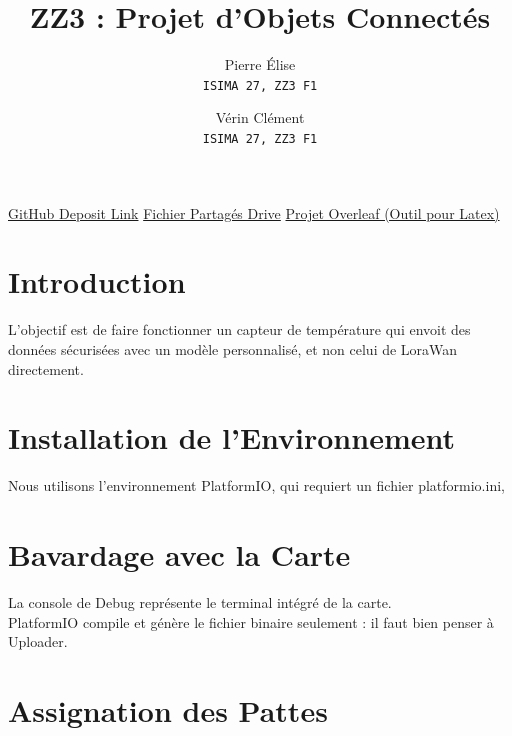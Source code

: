 \documentclass[10pt,a4paper,oneside]{article}
\author
{
  Pierre Élise \\ \texttt{ISIMA 27, ZZ3 F1}
  \and
  Vérin Clément \\ \texttt{ISIMA 27, ZZ3 F1}
}
\title{ZZ3 : Projet d'Objets Connectés}
\begin{document}
\fbox
{
  \parbox{\textwidth}
  {
    \centering
    \maketitle
  }
}


\begin{center}
  \href{https://github.com/ForoyV8-MF/ZZ3-Objets-Connectes-Projet-Pierre-Verin.git} {GitHub Deposit Link}
  \href{https://docs.google.com/document/d/122-0kRPIf3k31qxZWXeNSvJEtt5LDkis1RGscYJJpbM/edit?tab=t.0} {Fichier Partagés Drive}
  \href{https://fr.overleaf.com/project/6abb691e5b82a3c004bbb391} {Projet Overleaf (Outil pour Latex)}
\end{center}

\newpage

\tableofcontents

\newpage

\section{Introduction}

L'objectif est de faire fonctionner un capteur de température qui envoit des données sécurisées avec un modèle personnalisé, et non celui de LoraWan directement.\\

\section{Installation de l'Environnement}

Nous utilisons l'environnement PlatformIO, qui requiert un fichier platformio.ini, 

\section{Bavardage avec la Carte}

La console de Debug représente le terminal intégré de la carte.\\
PlatformIO compile et génère le fichier binaire seulement : il faut bien penser à Uploader.\\

\section{Assignation des Pattes}
\end{document}
